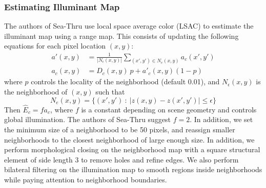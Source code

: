 \documentclass[10pt,twocolumn,letterpaper]{article}
\begin{document}
\subsubsection*{Estimating Illuminant Map}
The authors of Sea-Thru use local space average color (LSAC) to esstimate the illuminant
map using a range map. This consists of updating the following equations for each pixel
location $(x,y)$:
\begin{align}
    a'(x, y) &= \frac1{|N_\epsilon(x, y)|} \sum_{(x', y') \in N_e(x, y)} {a_c(x', y')} \label{eqn:lsac1} \\
    a_c(x, y) &= D_c(x, y) \ p + a'_c(x, y)(1-p) \label{eqn:lsac2}
\end{align}
where $p$ controls the locality of the neighborhood (default 0.01), and
$N_\epsilon(x, y)$ is the neighborhood of $(x, y)$ such that
\begin{equation}
N_e(x, y) = \lbrace (x', y') \: : \: |z(x, y) - z(x', y')| \leq \epsilon \rbrace
\end{equation}
Then $\hat{E}_c = fa_c$, where $f$ is a constant depending on scene geometry and controls global illumination.
The authors of Sea-Thru suggest $f=2$.
In addition, we set the minimum size of a neighborhood to be 50 pixels, and reassign smaller neighborhoods
to the closest neighborhood of large enough size. In addition, we perform morphological closing on the
neighborhood map with a square structural element of side length 3 to remove holes and refine edges.
We also perform bilateral filtering on the illumination map to smooth regions inside neighborhoods
while paying attention to neighborhood boundaries.
\end{document}
